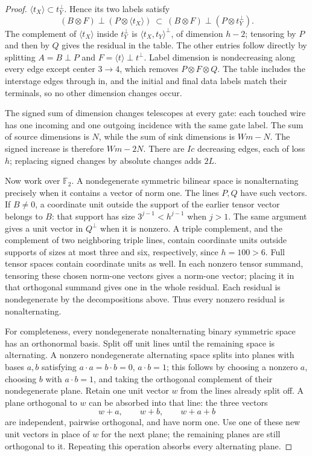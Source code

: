 \begin{proof}
$\langle t_X\rangle\subset t_Y^\perp$.  Hence its two labels satisfy
\[
 (B\otimes F)\mathbin{\perp}(P\otimes\langle t_X\rangle)
 \ \subset\
 (B\otimes F)\mathbin{\perp}(P\otimes t_Y^\perp).
\]
The complement of $\langle t_X\rangle$ inside $t_Y^\perp$ is
$\langle t_X,t_Y\rangle^\perp$, of dimension $h-2$; tensoring by
$P$ and then by $Q$ gives the residual in the table.  The other entries
follow directly by splitting $A=B\mathbin{\perp}P$ and
$F=\langle t\rangle\mathbin{\perp}t^\perp$.
Label dimension is nondecreasing along every edge except center $3\to4$, which removes
$P\otimes F\otimes Q$.  The table includes the interstage edges through
$\mathrm{in}$, and the initial and final data labels match their terminals,
so no other dimension changes occur.

The signed sum of dimension changes telescopes at every gate: each
touched wire has one incoming and one outgoing incidence with the same
gate label.  The sum of source dimensions is $N$, while the sum of
sink dimensions is $Wm-N$.  The signed increase is therefore $Wm-2N$.
There are $Ic$ decreasing edges, each of loss $h$; replacing signed
changes by absolute changes adds $2L$.

Now work over $\mathbb F_2$.  A nondegenerate symmetric bilinear space
is nonalternating precisely when it contains a vector of norm one.
The lines $P,Q$ have such vectors.  If $B\ne0$, a coordinate unit
outside the support of the earlier tensor vector belongs to $B$:
that support has size $3^{j-1}<h^{j-1}$ when $j>1$.
The same argument gives a unit vector in $Q^\perp$ when it is nonzero.
A triple complement, and the complement of two neighboring triple
lines, contain coordinate units outside supports of sizes at most
three and six, respectively, since $h=100>6$.  Full tensor spaces contain coordinate
units as well.  In each nonzero tensor summand, tensoring these chosen
norm-one vectors gives a norm-one vector; placing it in that orthogonal
summand gives one in the whole residual.  Each residual is nondegenerate
by the decompositions above.  Thus every nonzero residual is nonalternating.

For completeness, every nondegenerate nonalternating binary symmetric
space has an orthonormal basis.  Split off unit lines until the
remaining space is alternating.  A nonzero nondegenerate alternating
space splits into planes with bases $a,b$ satisfying
$a\cdot a=b\cdot b=0$, $a\cdot b=1$; this follows by choosing a
nonzero $a$, choosing $b$ with $a\cdot b=1$, and taking the orthogonal
complement of their nondegenerate plane.  Retain one unit vector $w$
from the lines already split off.  A plane orthogonal to $w$ can be
absorbed into that line: the three vectors
\[
 w+a,\qquad w+b,\qquad w+a+b
\]
are independent, pairwise orthogonal, and have norm one.
Use one of these new unit vectors in place of $w$ for the next plane;
the remaining planes are still orthogonal to it.  Repeating this
operation absorbs every alternating plane.
\end{proof}

